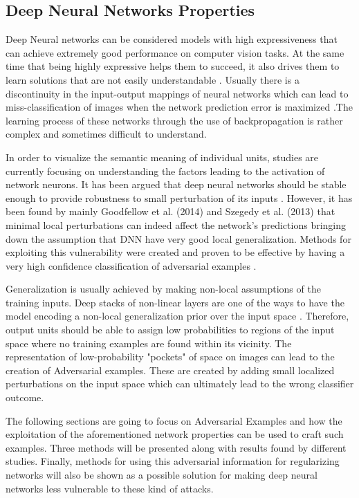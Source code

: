 \documentclass{article}
\begin{document}
\subsection{Deep Neural Networks Properties}\label{subsec: nn_props}

Deep Neural networks can be considered models with high expressiveness that can achieve extremely good performance on computer vision tasks. At the same time that being highly expressive helps them to succeed, it also drives them to learn solutions that are not easily understandable \cite{szegedy2013}. Usually there is a discontinuity in the input-output mappings of neural networks which can lead to miss-classification of images when the network prediction error is maximized \cite{gu2014}.The learning process of these networks through the use of backpropagation is rather complex and sometimes difficult to understand.

In order to visualize the semantic meaning of individual units, studies are currently focusing on understanding the factors leading to the activation of network neurons. It has been argued that deep neural networks should be stable enough to provide robustness to small perturbation of its inputs \cite{szegedy2013}. However, it has been found by mainly Goodfellow et al. (2014) and Szegedy et al. (2013) that minimal local perturbations can indeed affect the network's predictions bringing down the assumption that DNN have very good local generalization. Methods for exploiting this vulnerability were created and proven to be effective by having a very high confidence classification of adversarial examples \cite{goodfellow2016}.

Generalization is usually achieved by making non-local assumptions of the training inputs. Deep stacks of non-linear layers are one of the ways to have the model encoding a non-local generalization prior over the input space \cite{gu2014}. Therefore, output units should be able to assign low probabilities to regions of the input space where no training examples are found within its vicinity. The representation of low-probability "pockets" of space on images can lead to the creation of Adversarial examples. These are created by adding small localized perturbations on the input space which can ultimately lead to the wrong classifier outcome. 

The following sections are going to focus on Adversarial Examples and how the exploitation of the aforementioned network properties can be used to craft such examples. Three methods will be presented along with results found by different studies. Finally, methods for using this adversarial information for regularizing networks will also be shown as a possible solution for making deep neural networks less vulnerable to these kind of attacks.
\end{document}
